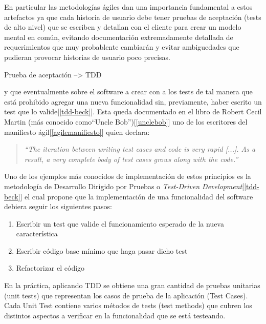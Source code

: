 \par En particular las metodologías ágiles dan una importancia fundamental a estos artefactos ya que cada historia de usuario debe tener pruebas de aceptación (tests de alto nivel) que se escriben y detallan con el cliente para crear un modelo mental en común, evitando documentación extremadamente detallada de requerimientos que muy probablente cambiarán y evitar ambiguedades que pudieran provocar historias de usuario poco precisas. 

\par Prueba de aceptación --> TDD


 y que eventualmente   sobre el software a crear con  a los tests de tal manera que está prohibido agregar una nueva funcionalidad sin, previamente, haber escrito un test que lo valide[\ref{tdd-beck}]. Esta queda documentado en el libro de Robert Cecil Martin (más conocido como``Uncle Bob'')[\ref{unclebob}] uno de los escritores del manifiesto ágil[\ref{agilemanifiesto}] quien declara:

\begin{quote}
\emph{``The iteration between writing test cases and code is very rapid [...]. As a result, a very complete body of test cases grows along with the code.''}
\end{quote}

\par Uno de los ejemplos más conocidos de implementación de estos principios es la metodología de Desarrollo Dirigido por Pruebas o \emph{Test-Driven Development}[\ref{tdd-beck}] el cual propone que la implementación de una funcionalidad del software debiera seguir los siguientes pasos:\\

\begin{enumerate}
\item Escribir un test que valide el funcionamiento esperado de la nueva característica
\item Escribir código base mínimo que haga pasar dicho test
\item Refactorizar el código
\end{enumerate}

\par En la práctica, aplicando TDD se obtiene una gran cantidad de pruebas unitarias (unit tests) que representan los casos de prueba de la aplicación (Test Cases). Cada Unit Test contiene varios métodos de tests (test methods) que cubren los distintos aspectos a verificar en la funcionalidad que se está testeando.

